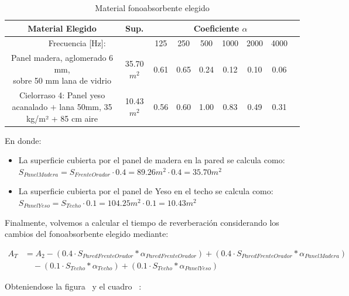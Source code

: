 \begin{table}[h]
    \centering
    \begin{tabular}{|c|c|c||c|c|c|c|c|c|} \hline
         Material Elegido & Sup. & \multicolumn{6}{|c|}{Coeficiente $\alpha$} \\ \hline
        \multicolumn{2}{|c|}{Frecuencia [Hz]:} & 125 & 250 & 500 & 1000 & 2000 & 4000 \\ \hline
        \makecell{Panel madera, aglomerado 6 mm,\\ sobre 50 mm lana de vidrio} & 35.70$m^2$ & 0.61 &0.65&0.24&0.12&0.10&0.06 \\ \hline  
        \makecell{Cielorraso 4: Panel yeso acanalado $+$\\ lana 50mm, 35 kg/m² + 85 cm aire} & 10.43$m^2$ & 0.56 & 0.60 & 1.00 & 0.83 & 0.49 & 0.31 \\ \hline
    \end{tabular}
    \caption{Material fonoabsorbente elegido}
    \label{tab:datos_mat_fonoabsorbente}
\end{table}

\par En donde:
\begin{itemize}
    \item La superficie cubierta por el panel de madera en la pared se calcula como: $S_{PanelMadera} = S_{FrenteOrador} \cdot 0.4 = 89.26m^2 \cdot 0.4= 35.70m^2$
    \item La superficie cubierta por el panel de Yeso en el techo se calcula como: $S_{PanelYeso} = S_{Techo} \cdot 0.1 = 104.25 m^2 \cdot 0.1 = 10.43m^2$
\end{itemize}

\par Finalmente, volvemos a calcular el tiempo de reverberación considerando los cambios del fonoabsorbente elegido mediante:

\begin{align*}
        A_T &= A_2 - (0.4 \cdot S_{ParedFrenteOrador} * \alpha_{ParedFrenteOrador}) + (0.4 \cdot S_{ParedFrenteOrador} * \alpha_{PanelMadera})\\
    &\quad -(0.1 \cdot S_{Techo} * \alpha_{Techo}) + (0.1 \cdot S_{Techo} * \alpha_{PanelYeso})
\end{align*}


\par Obteniendose la figura~ y el cuadro~ :

